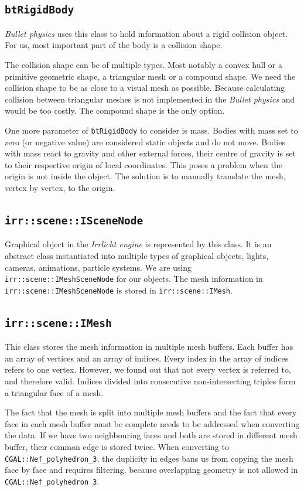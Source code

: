 \subsection*{\tt btRigidBody}
\emph{Bullet physics} uses this class to hold information about a rigid collision object. For us, most important part of the body is a collision shape.

The collision shape can be of multiple types. Most notably a convex hull or a primitive geometric shape, a triangular mesh or a compound shape. We need the collision shape to be as close to a visual mesh as possible. Because calculating collision between triangular meshes is not implemented in the \emph{Bullet physics} and would be too costly. The compound shape is the only option.

One more parameter of {\tt btRigidBody} to consider is mass. Bodies with mass set to zero (or negative value) are considered static objects and do not move. Bodies with mass react to gravity and other external forces, their centre of gravity is set to their respective origin of local coordinates. This poses a problem when the origin is not inside the object. The solution is to manually translate the mesh, vertex by vertex, to the origin.

\subsection*{\tt irr::scene::ISceneNode} 
Graphical object in the \emph{Irrlicht engine} is represented by this class. It is an abstract class instantiated into multiple types of graphical objects, \eg lights, cameras, animations, particle systems. We are using {\tt irr::scene::IMeshSceneNode} for our objects. The mesh information in {\tt irr::scene::IMeshSceneNode} is stored in {\tt irr::scene::IMesh}. 

\subsection*{\tt irr::scene::IMesh} 
This class stores the mesh information in multiple mesh buffers. Each buffer has an array of vertices and an array of indices. Every index in the array of indices refers to one vertex. However, we found out that not every vertex is referred to, and therefore valid. Indices divided into consecutive non-intersecting triples form a triangular face of a mesh. 

The fact that the mesh is split into multiple mesh buffers and the fact that every face in each mesh buffer must be complete needs to be addressed when converting the data. If we have two neighbouring faces and both are stored in different mesh buffer, their common edge is stored twice. When converting to {\tt CGAL::Nef\_polyhedron\_3}, the duplicity in edges bans us from copying the mesh face by face and requires filtering, because overlapping geometry is not allowed in {\tt CGAL::Nef\_polyhedron\_3}.

